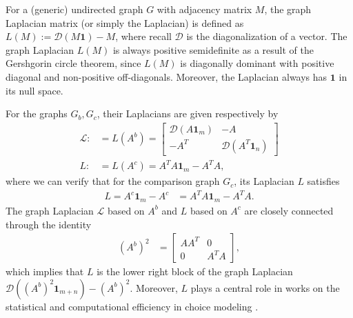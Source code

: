 For a (generic) undirected graph $G$ with adjacency matrix $M$, the graph Laplacian matrix (or simply the Laplacian) is defined as $L(M):=\mathcal{D}(M\mathbf{1})-M$, where recall $\mathcal{D}$ is the diagonalization of a vector. The graph Laplacian $L(M)$ is always positive semidefinite as a result of the Gershgorin circle theorem, since $L(M)$ is diagonally dominant  with positive diagonal and non-positive off-diagonals. Moreover, the Laplacian always has $\mathbf{1}$ in its null space.

For the graphs $G_b,G_c$, their Laplacians are  given respectively by 
\begin{align}
    \label{eq:Laplacians}
\mathcal{L}:&=L(A^b)=\begin{bmatrix}\mathcal{D}({A}\mathbf{1}_{m}) & -{A}\\
-{A}^{T} & \mathcal{D}({A}^{T}\mathbf{1}_{n})
\end{bmatrix} \\L:&=L(A^c)=A^TA\mathbf{1}_m-A^TA,
\end{align}
where we can
verify that for the comparison graph $G_c$, its Laplacian $L$ satisfies
\begin{align*}
L=A^c\mathbf{1}_{m}-A^c & =A^{T}A\mathbf{1}_{m}-A^{T}A.
\end{align*}
The graph Laplacian $\mathcal{L}$ based on $A^b$ and $L$ based on $A^c$ are closely connected through the identity
\begin{align*} (A^{b})^{2}&=\begin{bmatrix}AA^{T} & 0\\
0 & A^{T}A
\end{bmatrix},
\end{align*}
which implies that $L$ is the lower right block of the graph Laplacian $\mathcal{D}((A^{b})^{2}\mathbf{1}_{m+n})-(A^{b})^{2}$. Moreover, $L$ plays a central role in works on the statistical and computational efficiency in choice modeling \citep{shah2015estimation,seshadri2020learning,vojnovic2020convergence}.

